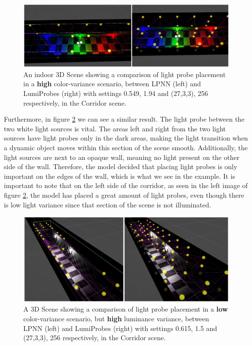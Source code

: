 \begin{figure}[h]
	\centering
	\includegraphics[width=\linewidth]{Graphics/results/concats/comparison1.png}
	\caption{An indoor 3D Scene showing a comparison of light probe placement in a \textbf{high} color-variance scenario, between LPNN (left) and LumiProbes (right) with settings 0.549, 1.94 and (27,3,3), 256 respectively, in the Corridor scene.}
	\label{fig:comp1}
\end{figure}

Furthermore, in figure \ref{fig:comp2} we can see a similar result. The light probe between the two white light sources is vital. The areas left and right from the two light sources have light probes only in the dark areas, making the light transition when a dynamic object moves within this section of the scene smooth. Additionally, the light sources are next to an opaque wall, meaning no light present on the other side of the wall. Therefore, the model decided that placing light probes is only important on the edges of the wall, which is what we see in the example. It is important to note that on the left side of the corridor, as seen in the left image of figure \ref{fig:comp2}, the model has placed a great amount of light probes, even though there is low light variance since that section of the scene is not illuminated. 

\begin{figure}[h]
	\centering
	\includegraphics[width=\linewidth]{Graphics/results/concats/comparison2.png}
	\caption{A 3D Scene showing a comparison of light probe placement in a \textbf{low} color-variance scenario, but \textbf{high} luminance variance, between LPNN (left) and LumiProbes (right) with settings 0.615, 1.5 and (27,3,3), 256 respectively, in the Corridor scene.}
	\label{fig:comp2}
\end{figure}

